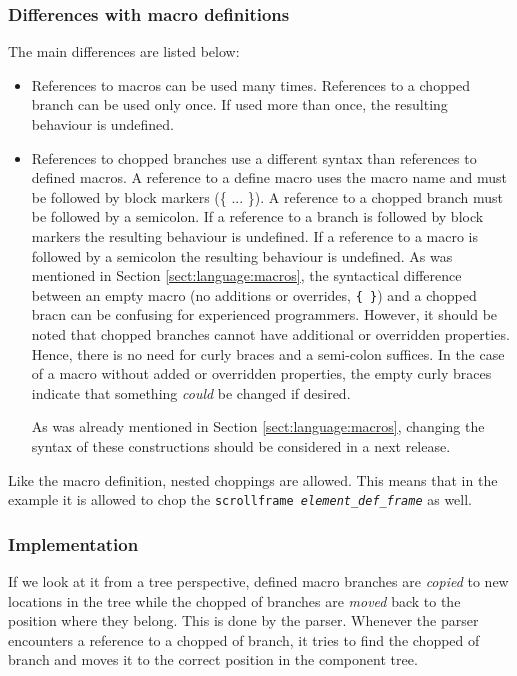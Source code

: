 \subsubsection*{Differences with macro definitions}
The main differences are listed below:
\begin{itemize}
\item References to macros can be used many times. References to a chopped branch
can be used only once. If used more than once, the resulting behaviour is
undefined.
\item References to chopped branches use a different syntax than references to
defined macros. A reference to a define macro uses the macro name and must be
followed by block markers (\{ ... \}). A reference to a chopped branch must be
followed by a semicolon. If a reference to a branch is followed by block
markers the resulting behaviour is undefined. If a reference to a macro is
followed by a semicolon the resulting behaviour is undefined. As was mentioned
in Section \ref{sect:language:macros}, the syntactical difference between an
empty macro (no additions or overrides, \verb={ }=) and a chopped bracn can be
confusing for experienced programmers. However, it should be noted that chopped
branches cannot have additional or overridden properties. Hence, there is no
need for curly braces and a semi-colon suffices. In the case of a macro without
added or overridden properties, the empty curly braces indicate that something
\emph{could} be changed if desired.

As was already mentioned in Section \ref{sect:language:macros}, changing the
syntax of these constructions should be considered in a next release.
\end{itemize}

\bigskip \noindent
Like the macro definition, nested choppings are allowed. This means that in the
example it is allowed to chop the \texttt{scrollframe
\emph{element\_def\_frame}} as well.

\subsubsection*{Implementation}
If we look at it from a tree perspective, defined macro branches are
\emph{copied} to new locations in the tree while the chopped of branches are
\emph{moved} back to the position where they belong. This is done by
the parser. Whenever the parser encounters a reference to a chopped of branch,
it tries to find the chopped of branch and moves it to the correct position in
the component tree.

